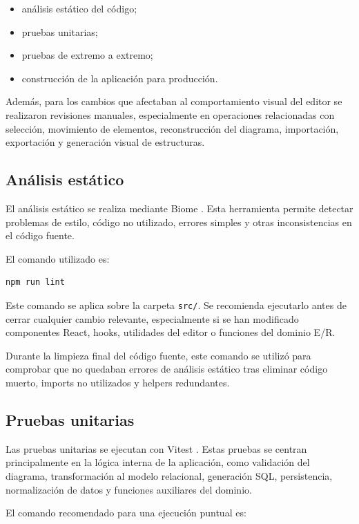 \begin{itemize}
\item análisis estático del código;
\item pruebas unitarias;
\item pruebas de extremo a extremo;
\item construcción de la aplicación para producción.
\end{itemize}

Además, para los cambios que afectaban al comportamiento visual del editor se realizaron revisiones manuales, especialmente en operaciones relacionadas con selección, movimiento de elementos, reconstrucción del diagrama, importación, exportación y generación visual de estructuras.

\subsection{Análisis estático}

El análisis estático se realiza mediante Biome \cite{biome}. Esta herramienta permite detectar problemas de estilo, código no utilizado, errores simples y otras inconsistencias en el código fuente.

El comando utilizado es:

\begin{verbatim}
npm run lint
\end{verbatim}

Este comando se aplica sobre la carpeta \texttt{src/}. Se recomienda ejecutarlo antes de cerrar cualquier cambio relevante, especialmente si se han modificado componentes React, hooks, utilidades del editor o funciones del dominio E/R.

Durante la limpieza final del código fuente, este comando se utilizó para comprobar que no quedaban errores de análisis estático tras eliminar código muerto, imports no utilizados y helpers redundantes.

\subsection{Pruebas unitarias}

Las pruebas unitarias se ejecutan con Vitest \cite{vitest}. Estas pruebas se centran principalmente en la lógica interna de la aplicación, como validación del diagrama, transformación al modelo relacional, generación SQL, persistencia, normalización de datos y funciones auxiliares del dominio.

El comando recomendado para una ejecución puntual es:

